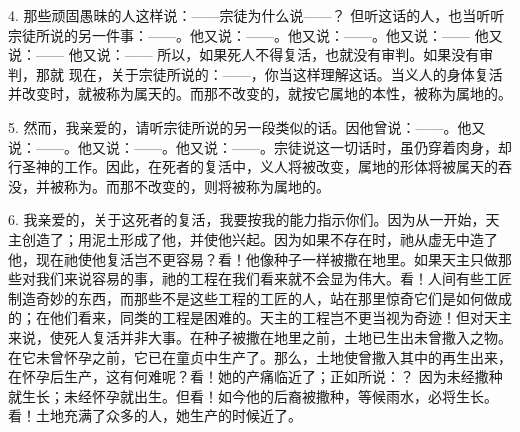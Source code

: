 4. 那些顽固愚昧的人这样说：——宗徒为什么说——？ 但听这话的人，也当听听宗徒所说的另一件事：——。他又说：——。他又说：——。他又说：—— 他又说：—— 他又说：—— 所以，如果死人不得复活，也就没有审判。如果没有审判，那就  现在，关于宗徒所说的：——，你当这样理解这话。当义人的身体复活并改变时，就被称为属天的。而那不改变的，就按它属地的本性，被称为属地的。\par

5. 然而，我亲爱的，请听宗徒所说的另一段类似的话。因他曾说：——。他又说：——。他又说：——。他又说：——。宗徒说这一切话时，虽仍穿着肉身，却行圣神的工作。因此，在死者的复活中，义人将被改变，属地的形体将被属天的吞没，并被称为。而那不改变的，则将被称为属地的。\par

6. 我亲爱的，关于这死者的复活，我要按我的能力指示你们。因为从一开始，天主创造了；用泥土形成了他，并使他兴起。因为如果不存在时，祂从虚无中造了他，现在祂使他复活岂不更容易？看！他像种子一样被撒在地里。如果天主只做那些对我们来说容易的事，祂的工程在我们看来就不会显为伟大。看！人间有些工匠制造奇妙的东西，而那些不是这些工程的工匠的人，站在那里惊奇它们是如何做成的；在他们看来，同类的工程是困难的。天主的工程岂不更当视为奇迹！但对天主来说，使死人复活并非大事。在种子被撒在地里之前，土地已生出未曾撒入之物。在它未曾怀孕之前，它已在童贞中生产了。那么，土地使曾撒入其中的再生出来，在怀孕后生产，这有何难呢？看！她的产痛临近了；正如所说：？ 因为未经撒种就生长；未经怀孕就出生。但看！如今他的后裔被撒种，等候雨水，必将生长。看！土地充满了众多的人，她生产的时候近了。\par

